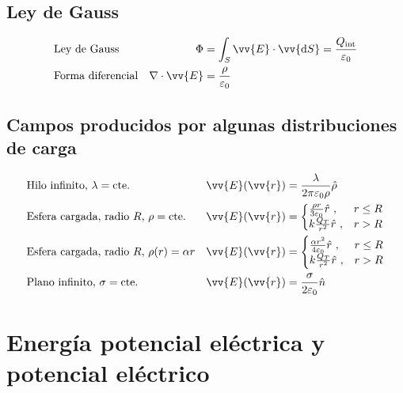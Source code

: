 \documentclass[a4paper, 8pt]{extarticle}
\renewcommand{\vec}[1]{\vv{{#1}}}
\renewcommand{\grad}{\nabla}
\begin{document}
\begin{multicols}{3}
  \subsection{Ley de Gauss}
  \begin{align*}
     & \text{Ley de Gauss}      & \Phi                & = \int _S \vec{E} \cdot \vec{\dd S} = \frac{Q_{\text{int}}}{\varepsilon _0} \\
     & \text{Forma diferencial} & \grad \cdot \vec{E} & = \frac{\rho}{\varepsilon _0}                                               \\
  \end{align*}

  \subsection{Campos producidos por algunas distribuciones de carga}

  \begin{align*}
     & \text{Hilo infinito, }\lambda = \text{cte.}                  & \vec{E}(\vec{r}) & = \frac{\lambda}{2\pi\varepsilon_0\rho} \hat{\rho} \\
     & \text{Esfera cargada, radio }R \text{, } \rho = \text{cte.}  & \vec{E}(\vec{r}) & = \left\lbrace
    \begin{matrix*}[l]
      \frac{\rho r}{3 \varepsilon_0} \hat{r}\ , & r \leq R \\
      k\frac{Q_T}{r^2} \hat{r}\ , & r > R
    \end{matrix*} \right.                                                                                    \\
     & \text{Esfera cargada, radio }R \text{, } \rho (r) = \alpha r & \vec{E}(\vec{r}) & = \left\lbrace
    \begin{matrix*}[l]
      \frac{\alpha r^2}{4 \varepsilon_0} \hat{r}\ , & r \leq R \\
      k\frac{Q_T}{r^2} \hat{r}\ , & r > R
    \end{matrix*} \right.                                                                                \\
     & \text{Plano infinito, }\sigma = \text{cte.}                  & \vec{E}(\vec{r}) & = \frac{\sigma}{2\varepsilon_0} \hat{n}            \\
  \end{align*}

  \section{Energía potencial eléctrica y potencial eléctrico}

\end{multicols}
\end{document}

